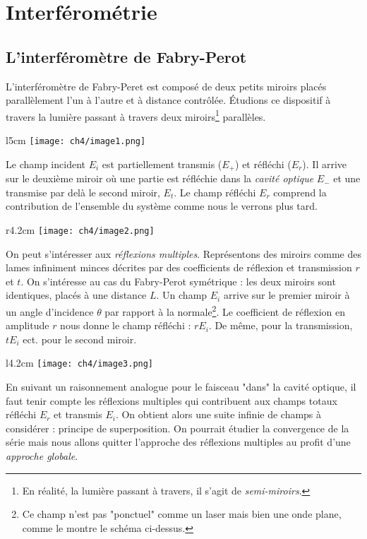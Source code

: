 \chapter{Interférométrie}

\section{L'interféromètre de Fabry-Perot}
L’interféromètre de Fabry-Peret est composé de deux petits miroirs placés parallèlement l'un à 
l'autre et à distance contrôlée. Étudions ce dispositif à travers la lumière passant à travers 
deux miroirs\footnote{En réalité, la lumière passant à travers, il s'agit de \textit{semi-miroirs}.} 
parallèles.\\

	\begin{wrapfigure}[6]{l}{5cm}
	\vspace{-5mm}
	\texttt{[image: ch4/image1.png]}
	\end{wrapfigure}
Le champ incident $E_i$ est partiellement transmis ($E_+$) et réfléchi ($E_r$). Il arrive sur 
le deuxième miroir où une partie est réfléchie dans la \textit{cavité optique} $E_-$ et une transmise 
par delà le second miroir, $E_t$. Le champ réfléchi $E_r$ comprend la contribution de l'ensemble 
du système comme nous le verrons plus tard. \\

	\begin{wrapfigure}[8]{r}{4.2cm}
	\vspace{-5mm}
	\texttt{[image: ch4/image2.png]}
	\end{wrapfigure}
On peut s'intéresser aux \textit{réflexions multiples}. Représentons des miroirs comme 
des lames infiniment minces décrites par des coefficients de réflexion et transmission $r$ et $t$. 
On s'intéresse au cas du Fabry-Perot symétrique : les deux miroirs sont identiques, placés à une 
distance $L$. Un champ $E_i$ arrive sur le premier miroir à un angle d’incidence $\theta$ par 
rapport à la normale\footnote{Ce champ n'est pas "ponctuel" comme un laser mais bien une onde 
plane, comme le montre le schéma ci-dessus.}. Le coefficient de réflexion en amplitude $r$ nous 
donne le champ réfléchi : $rE_i$. De même, pour la transmission, $tE_i$ ect. pour le second miroir.\\

	\begin{wrapfigure}[8]{l}{4.2cm}
	\vspace{-5mm}
	\texttt{[image: ch4/image3.png]}
	\end{wrapfigure}
En suivant un raisonnement analogue pour le faisceau "dans" la cavité optique, il faut tenir compte 
les réflexions multiples qui contribuent aux champs totaux réfléchi $E_r$ et transmis $E_i$. On obtient 
alors une suite infinie de champs à considérer : principe de superposition. On pourrait étudier la 
convergence de la série mais nous allons quitter l'approche des réflexions multiples au profit d'une 
\textit{approche globale}.\\

